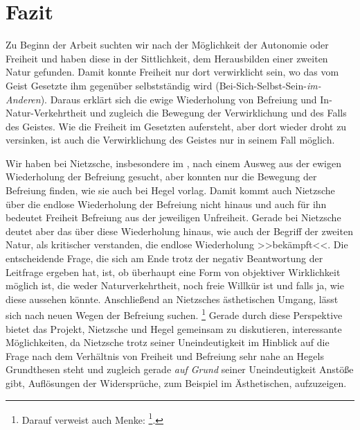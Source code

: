 \documentclass[12pt, a4paper, openany]{report}
\begin{document}
\chapter{Fazit}
Zu Beginn der Arbeit suchten wir nach der Möglichkeit der Autonomie oder Freiheit und haben diese in der Sittlichkeit, dem Herausbilden einer zweiten Natur gefunden.
Damit konnte Freiheit nur dort verwirklicht sein, wo das vom Geist Gesetzte ihm gegenüber selbstständig wird (Bei-Sich-Selbst-Sein-\emph{im-Anderen}).
Daraus erklärt sich die ewige Wiederholung von Befreiung und In-Natur-Verkehrtheit und zugleich die Bewegung der Verwirklichung und des Falls des Geistes. 
Wie die Freiheit im Gesetzten aufersteht, aber dort wieder droht zu versinken, ist auch die Verwirklichung des Geistes nur in seinem Fall möglich.

Wir haben bei Nietzsche, insbesondere im , nach einem Ausweg aus der ewigen Wiederholung der Befreiung gesucht, aber konnten nur die Bewegung der Befreiung finden, wie sie auch bei Hegel vorlag. 
Damit kommt auch Nietzsche über die endlose Wiederholung der Befreiung nicht hinaus und auch für ihn bedeutet Freiheit Befreiung aus der jeweiligen Unfreiheit. 
Gerade bei Nietzsche deutet aber das  über diese Wiederholung hinaus, wie auch der Begriff der zweiten Natur, als kritischer verstanden, die endlose Wiederholung >>bekämpft<<. 
Die entscheidende Frage, die sich am Ende trotz der negativ Beantwortung der Leitfrage ergeben hat, ist, ob überhaupt eine Form von objektiver Wirklichkeit möglich ist, die weder Naturverkehrtheit, noch freie Willkür ist und falls ja, wie diese aussehen könnte.
Anschließend an Nietzsches ästhetischen Umgang, lässt sich nach neuen Wegen der Befreiung suchen.%
\footnote{
    Darauf verweist auch Menke: \footcite[][50]{menke_autonomie_2018}.
}
Gerade durch diese Perspektive bietet das Projekt, Nietzsche und Hegel gemeinsam zu diskutieren, interessante Möglichkeiten, da Nietzsche trotz seiner Uneindeutigkeit im Hinblick auf die Frage nach dem Verhältnis von Freiheit und Befreiung sehr nahe an Hegels Grundthesen steht und zugleich gerade \emph{auf Grund} seiner Uneindeutigkeit Anstöße gibt, Auflösungen der Widersprüche, zum Beispiel im Ästhetischen, aufzuzeigen.

\backmatter
\printbibliography
 
\end{document}
